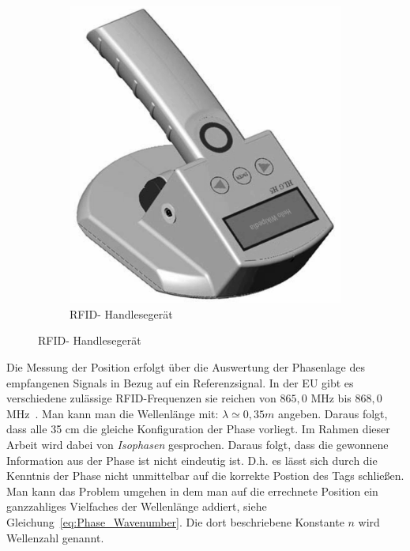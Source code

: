 \begin{figure} [h!]
%         
\qquad
%
         \begin{subfigure}[h]{0.4\textwidth}
                 \centering
                 \includegraphics[width=\textwidth]{img/RFID-Reader_gs.png}
                 \vspace{.1cm}
                 \caption{RFID- Handlesegerät }
                 \label{fig:READER}
         \end{subfigure}
\end{figure}
%
\label{sec:Measurement1}
%
%

Die Messung der Position erfolgt über die Auswertung der Phasenlage des empfangenen Signals in Bezug auf ein Referenzsignal. In der EU gibt es verschiedene zulässige RFID-Frequenzen sie reichen von $865,0$ MHz bis $868,0$ MHz~\cite{etsi1}. Man kann man die Wellenlänge mit: $ \lambda\simeq0,35 m $ angeben. Daraus folgt, dass alle 35 cm die gleiche Konfiguration der Phase vorliegt. Im Rahmen dieser Arbeit wird dabei von \textit{Isophasen} gesprochen. Daraus folgt, dass die gewonnene Information aus der Phase ist nicht eindeutig ist. D.h. es lässt sich durch die Kenntnis der Phase nicht unmittelbar auf die korrekte Postion des Tags schließen. Man kann das Problem umgehen in dem man auf die errechnete Position ein ganzzahliges Vielfaches der Wellenlänge addiert, siehe Gleichung~\ref{eq:Phase_Wavenumber}. Die dort beschriebene Konstante $n$ wird Wellenzahl genannt.\\
%


